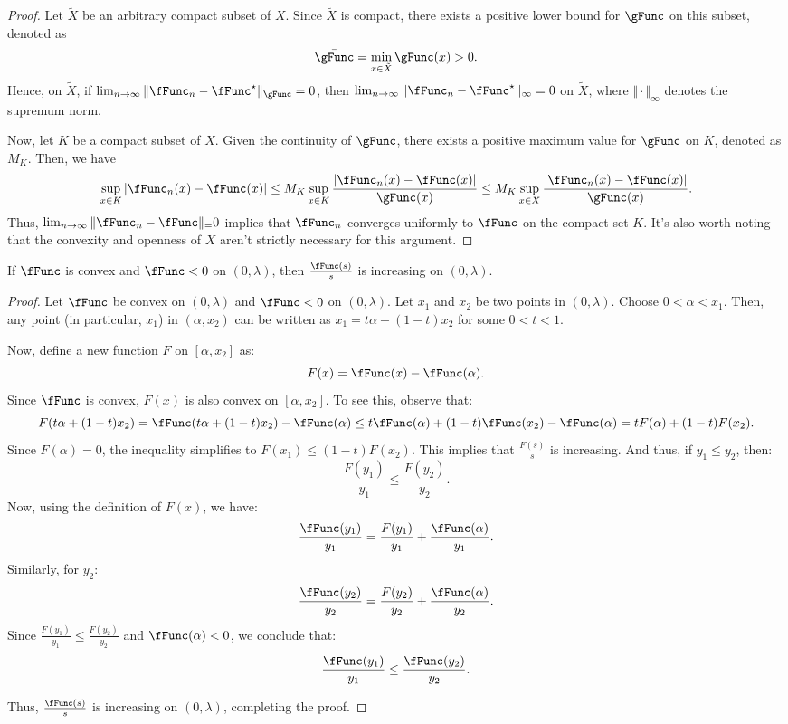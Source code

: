 \documentclass[\econtexRoot/BufferStockTheory]{subfiles}
\begin{document}
\begin{proof}
Let $\tilde{X}$ be an arbitrary compact subset of $X$.
Since $\tilde{X}$ is compact, there exists a positive lower bound for $\gFunc$ on this subset, denoted as 
\begin{equation}
\bar{\gFunc} = \min_{x \in \tilde{X}} \gFunc(x) > 0.
\end{equation}
Hence, on $\tilde{X}$, if $\lim_{n \to \infty} \Vert \fFunc_n - \fFunc^{\star} \Vert_\gFunc = 0$, then $\lim_{n \to \infty} \Vert \fFunc_n - \fFunc^{\star} \Vert_\infty = 0$ on $\tilde{X}$, where $\Vert \cdot \Vert_\infty$ denotes the supremum norm.


Now, let $K$ be a compact subset of $X$.
Given the continuity of $\gFunc$, there exists a positive maximum value for $\gFunc$ on $K$, denoted as $M_K$.
Then, we have
\begin{equation}
\sup_{x \in K} \vert \fFunc_n(x) - \fFunc(x)\vert  \leq M_K \sup_{x \in K} \frac{\vert \fFunc_n(x) - \fFunc(x)\vert }{\gFunc(x)} \leq M_K \sup_{x \in X} \frac{\vert \fFunc_n(x) - \fFunc(x)\vert }{\gFunc(x)}.
\end{equation}
Thus, $\lim_{n \to \infty} \Vert \fFunc_n - \fFunc \Vert_  = 0$ implies that $\fFunc_n$ converges uniformly to $\fFunc$ on the compact set $K$.
It's also worth noting that the convexity and openness of $X$ aren't strictly necessary for this argument.
\end{proof}


\begin{claim}\label{claim:rationondec}
If $\fFunc$ is convex and $\fFunc < 0$ on $(0, \lambda)$, then $\frac{\fFunc(s)}{s}$ is increasing on $(0, \lambda)$.
\end{claim}

\begin{proof}
Let $\fFunc$ be convex on $(0, \lambda)$ and $\fFunc < 0$ on $(0, \lambda)$. Let $x_1$ and $x_2$ be two points in $(0, \lambda)$. Choose $0 < \alpha < x_1$. Then, any point (in particular, $x_1$) in $(\alpha, x_2)$ can be written as $x_1 = t \alpha + (1 - t) x_2$ for some $0 < t < 1$.

Now, define a new function $F$ on $[\alpha, x_2]$ as:
\[
F(x) = \fFunc(x) - \fFunc(\alpha).
\]
Since $\fFunc$ is convex, $F(x)$ is also convex on $[\alpha, x_2]$. To see this, observe that:
\[
F(t\alpha + (1-t)x_2) = \fFunc(t\alpha + (1-t)x_2) - \fFunc(\alpha) \leq t \fFunc(\alpha) + (1-t) \fFunc(x_2) - \fFunc(\alpha) = t F(\alpha) + (1-t) F(x_2).
\]
Since $F(\alpha) = 0$, the inequality simplifies to $F(x_1) \leq (1-t) F(x_2)$. This implies that $\frac{F(s)}{s}$ is increasing. And thus, if $y_1 \leq y_2$, then:
\[
\frac{F(y_1)}{y_1} \leq \frac{F(y_2)}{y_2}.
\]
Now, using the definition of $F(x)$, we have:
\[
\frac{\fFunc(y_1)}{y_1} = \frac{F(y_1)}{y_1} + \frac{\fFunc(\alpha)}{y_1}.
\]
Similarly, for $y_2$:
\[
\frac{\fFunc(y_2)}{y_2} = \frac{F(y_2)}{y_2} + \frac{\fFunc(\alpha)}{y_2}.
\]
Since $\frac{F(y_1)}{y_1} \leq \frac{F(y_2)}{y_2}$ and $\fFunc(\alpha) < 0$, we conclude that:
\[
\frac{\fFunc(y_1)}{y_1} \leq  \frac{\fFunc(y_2)}{y_2}.
\]

Thus, $\frac{\fFunc(s)}{s}$ is increasing on $(0, \lambda)$, completing the proof.
\end{proof}
\end{document}
